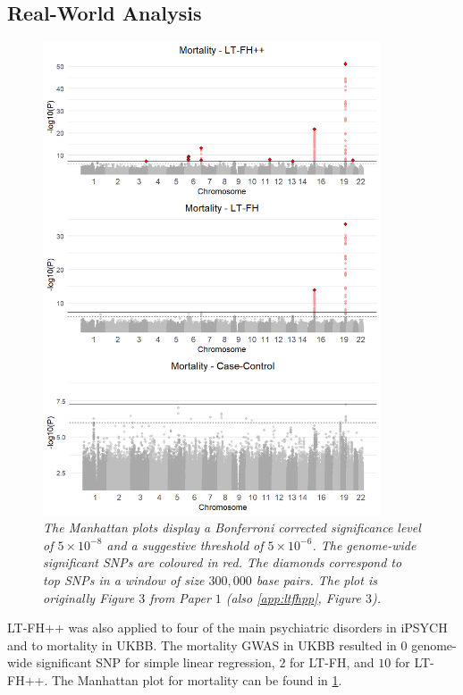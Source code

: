 \subsection{Real-World Analysis}
\begin{figure}
	\includegraphics[width=10cm]{results/manhattanPlot_mortality.png}
	\caption[Manhattan plots for LT-FH++, LT-FH, and case-control GWAS of mortality	in the UK Biobank]{
		\sl The Manhattan plots display a Bonferroni corrected significance level of $ 5\times 10^{-8} $ and a suggestive threshold of $ 5\times 10^{-6} $. The genome-wide significant SNPs are coloured in red. The diamonds correspond to top	SNPs in a window of size $ 300,000 $ base pairs. The plot is originally Figure $ 3 $ from Paper $ 1 $\cite{pedersen2022accounting} (also \cref{app:ltfhpp}, Figure $ 3 $).}
	\label{fig:LTFH++_manhattanMortality}
\end{figure}

LT-FH++ was also applied to four of the main psychiatric disorders in iPSYCH and to mortality in UKBB. The mortality GWAS in UKBB resulted in $ 0 $ genome-wide significant SNP for simple linear regression, $ 2 $ for LT-FH, and $ 10 $ for LT-FH++. The Manhattan plot for mortality can be found in \cref{fig:LTFH++_manhattanMortality}.

